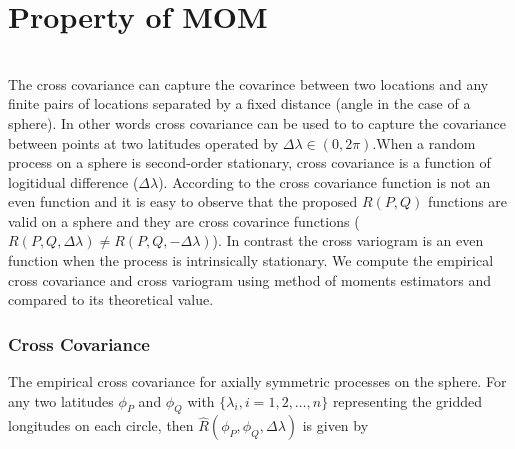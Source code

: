 		
	\section{Property of MOM}
		
		
	\\
		
	The cross covariance can capture the covarince between two locations and any finite pairs of locations separated by a fixed distance (angle in the case of a sphere). In other words cross covariance can be used to to capture the covariance between points at two latitudes operated by $\Delta \lambda \in (0,2\pi)$.When a random process on a sphere is second-order stationary, cross covariance is a function of logitidual difference ($\Delta\lambda$). According to \cite{Wackernagel2013} the cross covariance function is not an even function and it is easy to observe that the proposed $R(P,Q)$ functions are valid on a sphere and they are cross covarince functions ($R(P,Q, \Delta\lambda) \ne R(P,Q,-\Delta\lambda)$). In contrast the cross variogram is an even function when the process is intrinsically stationary. We compute the empirical cross covariance and cross variogram using method of moments estimators and compared to its theoretical value.
		
	\subsubsection{Cross Covariance}
		
	The empirical cross covariance for axially symmetric processes on the sphere. For any two latitudes $\phi_P$ and $\phi_Q$ with $\{\lambda_i, i = 1, 2, \ldots, n\}$ representing the gridded longitudes on each circle, then $\hat{R}(\phi_P, \phi_Q, \Delta \lambda)$ is given by
		
